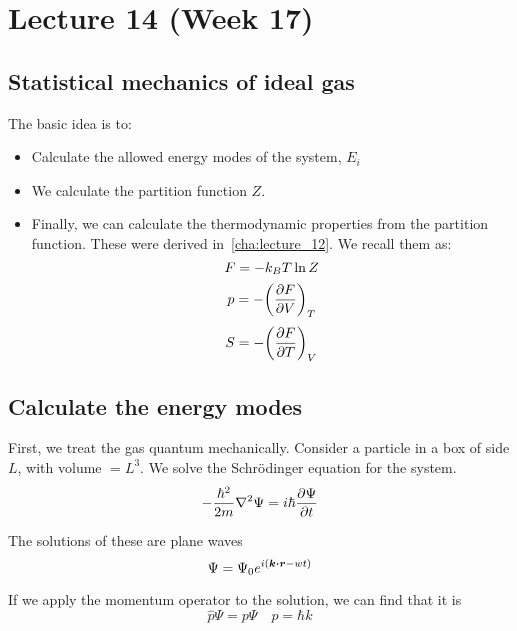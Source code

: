 \documentclass[12pt,chapterprefix=false,dvipsnames]{scrbook}
\theoremstyle{dotless}
\theoremstyle{definition}
\def\vec#1{{\ensuremath{\bm{{#1}}}}}
\begin{document}
\chapter{Lecture 14 (Week 17)}%
\label{cha:lecture_14}

\section{Statistical mechanics of ideal gas}%
\label{sec:statistical_mechanics_of_ideal_gas}

The basic idea is to:
\begin{itemize}
	\item Calculate the allowed energy modes of the system,
	      $E_i$
	\item We calculate the partition function $Z$.
	\item Finally, we can calculate the thermodynamic properties from the
	      partition function. These were derived
	      in~\ref{cha:lecture_12}. We recall them as:
	      \begin{equation}
		      F = -k_B T \naturallogarithm{Z}
	      \end{equation}
	      \begin{equation}
		      p = -{\left(\pdv{F}{V}\right)}_{T}
	      \end{equation}
	      \begin{equation}
		      S = -{\left(\pdv{F}{T}\right)}_{V}
	      \end{equation}
\end{itemize}

\section{Calculate the energy modes}%
\label{sec:calculate_the_energy_modes}

First, we treat the gas quantum mechanically. Consider a
particle in a box of side $L$, with volume
$ = L^3 $. We solve the Schrödinger equation for
the system.
\begin{equation}
	\label{eq:schrodingers_equation}
	-\frac{\hbar^2}{2m}\laplacian\Psi =
	i\hbar\pdv{\Psi}{t}
\end{equation}

The solutions of these are plane waves
\begin{equation}
	\Psi
	=
    \Psi_{0}e^{i\left(\vec{k}\vdot\vec{r} - wt\right)}
\end{equation}

If we apply the momentum operator to the solution, we can find
that it is
\begin{equation}
	\hat{p}\Psi
	=
	p\Psi \hspace{1em} p = \hbar k
\end{equation}
\end{document}
